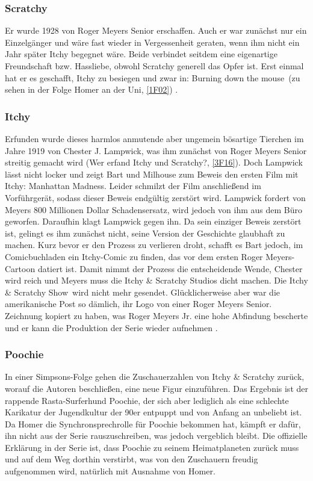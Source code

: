 \begin{appendix}
\subsubsection{Scratchy}
Er wurde 1928 von Roger Meyers Senior erschaffen. Auch er war zunächst nur ein Einzelgänger und wäre fast wieder in Vergessenheit geraten, wenn ihm nicht ein Jahr später Itchy begegnet wäre. Beide verbindet seitdem eine eigenartige Freundschaft bzw. Hassliebe, obwohl Scratchy generell das Opfer ist. Erst einmal hat er es geschafft, Itchy zu besiegen und zwar in: \glqq Burning down the mouse\grqq\ (zu sehen in der Folge \glqq Homer an der Uni\grqq , \ref{1F02}) \cite{itchy}.


\subsubsection{Itchy}
Erfunden wurde dieses harmlos anmutende aber ungemein bösartige Tierchen im Jahre 1919 von Chester J. Lampwick, was ihm zunächst von Roger Meyers Senior streitig gemacht wird (\glqq Wer erfand Itchy und Scratchy?\grqq , \ref{3F16}). Doch Lampwick lässt nicht locker und zeigt Bart und Milhouse zum Beweis den ersten Film mit Itchy: \glqq Manhattan Madness\grqq . Leider schmilzt der Film anschließend im Vorführgerät, sodass dieser Beweis endgültig zerstört wird. Lampwick fordert von Meyers 800 Millionen Dollar Schadensersatz, wird jedoch von ihm aus dem Büro geworfen. Daraufhin klagt Lampwick gegen ihn. Da sein einziger Beweis zerstört ist, gelingt es ihm zunächst nicht, seine Version der Geschichte glaubhaft zu machen. Kurz bevor er den Prozess zu verlieren droht, schafft es Bart jedoch, im Comicbuchladen ein Itchy-Comic zu finden, das vor dem ersten Roger Meyers-Cartoon datiert ist. Damit nimmt der Prozess die entscheidende Wende, Chester wird reich und Meyers muss die Itchy \& Scratchy Studios dicht machen. Die \glqq Itchy \& Scratchy Show\grqq\ wird nicht mehr gesendet. Glücklicherweise aber war die amerikanische Post so dämlich, ihr Logo von einer Roger Meyers Senior. Zeichnung kopiert zu haben, was Roger Meyers Jr. eine hohe Abfindung bescherte und er kann die Produktion der Serie wieder aufnehmen \cite{itchy}. 


\subsubsection{Poochie}
In einer Simpsons-Folge gehen die Zuschauerzahlen von Itchy \& Scratchy zurück, worauf die Autoren beschließen, eine neue Figur einzuführen. Das Ergebnis ist der rappende Rasta-Surferhund Poochie, der sich aber lediglich als eine schlechte Karikatur der Jugendkultur der 90er entpuppt und von Anfang an unbeliebt ist. Da Homer die Synchronsprechrolle für Poochie bekommen hat, kämpft er dafür, ihn nicht aus der Serie rauszuschreiben, was jedoch vergeblich bleibt. Die offizielle Erklärung in der Serie ist, dass Poochie zu seinem Heimatplaneten zurück muss und auf dem Weg dorthin verstirbt, was von den Zuschauern freudig aufgenommen wird, natürlich mit Ausnahme von Homer.


\end{appendix}
